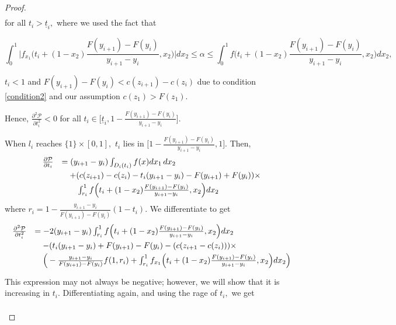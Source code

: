 \documentclass[12pt,reqno]{amsart}
\begin{document}
\begin{proof}
\[\begin{array}{ll}
\end{array}\]
for all $t_i>\underline{t}_i,$ where 
we used the fact that 


$$\int_0^1 \Big|f_{x_1}\Big(t_i+(1-x_2)\frac{F(y_{i+1})-F(y_{i})}{y_{i+1}-y_{i}},x_2\Big)\Big|dx_2 \le \alpha \le \int_0^1 f\Big(t_i+(1-x_2)\frac{F(y_{i+1})-F(y_{i})}{y_{i+1}-y_{i}},x_2\Big)dx_2,$$


$t_i < 1$ and $F(y_{i+1})-F(y_i)<c(z_{i+1})-c(z_i)$ due to condition \ref{condition2} and our assumption $c(z_1) >F(z_1)$.


Hence, $\frac{\partial^2\mathcal{P}}{\partial t_i^2}<0$ for all %
$t_i\in\Big[\underline{t}_i,1-\frac{F(y_{i+1})-F(y_i)}{y_{i+1}-y_i}\Big]$. 

When $l_i$ reaches $\{1\}\times[0,1],$ $t_i$ lies in $\Big[1-\frac{F(y_{i+1})-F(y_i)}{y_{i+1}-y_i},1\Big].$ Then,
\[\begin{array}{ll}\frac{\partial\mathcal{P}}{\partial t_i}&=(y_{i+1}-y_i)\int_{D_i(t_i)}f(x)dx_1\,dx_2\vspace{3pt}\\
&\quad+(c(z_{i+1})-c(z_i)-t_i(y_{i+1}-y_i)-F(y_{i+1})+F(y_i))\times \vspace{3pt}\\
&\quad\quad\int_{r_i}^1 f\Big(t_i+(1-x_2)\frac{F(y_{i+1})-F(y_{i})}{y_{i+1}-y_{i}},x_2\Big)dx_2\
\end{array}\]
where $r_i=1-\frac{y_{i+1}-y_i}{F(y_{i+1})-F(y_i)}(1-t_i).$ We differentiate to get
\[\begin{array}{ll}
\frac{\partial^2\mathcal{P}}{\partial t_i^2}&=-2(y_{i+1}-y_i)\int_{r_i}^1 f\Big(t_i+(1-x_2)\frac{F(y_{i+1})-F(y_{i})}{y_{i+1}-y_{i}},x_2\Big)dx_2\vspace{3pt}\\
&\quad-(t_i(y_{i+1}-y_i)+F(y_{i+1})-F(y_i)-(c(z_{i+1}-c(z_i)))\times\vspace{3pt}\\
&\quad\Big(-\frac{y_{i+1}-y_i}{F(y_{i+1})-F(y_i)}f(1,r_i)+\int_{r_i}^1 f_{x_1}\Big(t_i+(1-x_2)\frac{F(y_{i+1})-F(y_{i})}{y_{i+1}-y_{i}},x_2\Big)dx_2\Big)\vspace{3pt}\\
\end{array}\]
This expression may not always be negative; however, we will show that it is increasing in $t_i$.  Differentiating again, and using the rage of $t_i,$ we get

\[\begin{array}{ll}
    

\end{array}\]
\end{proof}
\end{document}
